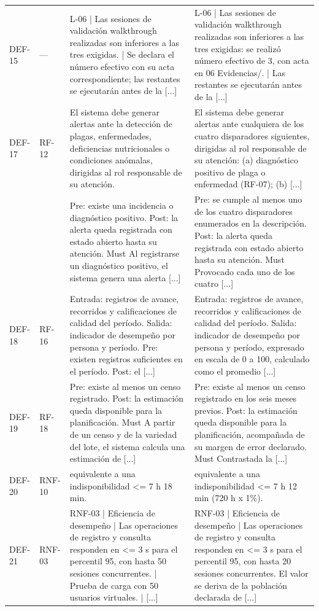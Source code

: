 \documentclass[11pt,letterpaper]{article}
\begin{document}
{\begin{longtable}{p{1.35cm} p{2.1cm} p{5.4cm} p{5.4cm}}
DEF-15 & — & L-06 | Las sesiones de validación walkthrough realizadas son inferiores a las tres exigidas. | Se declara el número efectivo con su acta correspondiente; las restantes se ejecutarán antes de la [...] & L-06 | Las sesiones de validación walkthrough realizadas son inferiores a las tres exigidas: se realizó número efectivo de 3, con acta en 06 Evidencias/. | Las restantes se ejecutarán antes de la [...]\\
DEF-17 & RF-12 & El sistema debe generar alertas ante la detección de plagas, enfermedades, deficiencias nutricionales o condiciones anómalas, dirigidas al rol responsable de su atención. & El sistema debe generar alertas ante cualquiera de los cuatro disparadores siguientes, dirigidas al rol responsable de su atención: (a) diagnóstico positivo de plaga o enfermedad (RF-07); (b) [...]\\
 &  & Pre: existe una incidencia o diagnóstico positivo. Post: la alerta queda registrada con estado abierto hasta su atención. Must Al registrarse un diagnóstico positivo, el sistema genera una alerta [...] & Pre: se cumple al menos uno de los cuatro disparadores enumerados en la descripción. Post: la alerta queda registrada con estado abierto hasta su atención. Must Provocado cada uno de los cuatro [...]\\
DEF-18 & RF-16 & Entrada: registros de avance, recorridos y calificaciones de calidad del período. Salida: indicador de desempeño por persona y período. Pre: existen registros suficientes en el período. Post: el [...] & Entrada: registros de avance, recorridos y calificaciones de calidad del período. Salida: indicador de desempeño por persona y período, expresado en escala de 0 a 100, calculado como el promedio [...]\\
DEF-19 & RF-18 & Pre: existe al menos un censo registrado. Post: la estimación queda disponible para la planificación. Must A partir de un censo y de la variedad del lote, el sistema calcula una estimación de [...] & Pre: existe al menos un censo registrado en los seis meses previos. Post: la estimación queda disponible para la planificación, acompañada de su margen de error declarado. Must Contrastada la [...]\\
DEF-20 & RNF-10 & equivalente a una indisponibilidad <= 7 h 18 min. & equivalente a una indisponibilidad <= 7 h 12 min (720 h x 1\%).\\
DEF-21 & RNF-03 & RNF-03 | Eficiencia de desempeño | Las operaciones de registro y consulta responden en <= 3 s para el percentil 95, con hasta 50 sesiones concurrentes. | Prueba de carga con 50 usuarios virtuales. | [...] & RNF-03 | Eficiencia de desempeño | Las operaciones de registro y consulta responden en <= 3 s para el percentil 95, con hasta 20 sesiones concurrentes. El valor se deriva de la población declarada de [...]\\

\end{longtable}}
\end{document}
